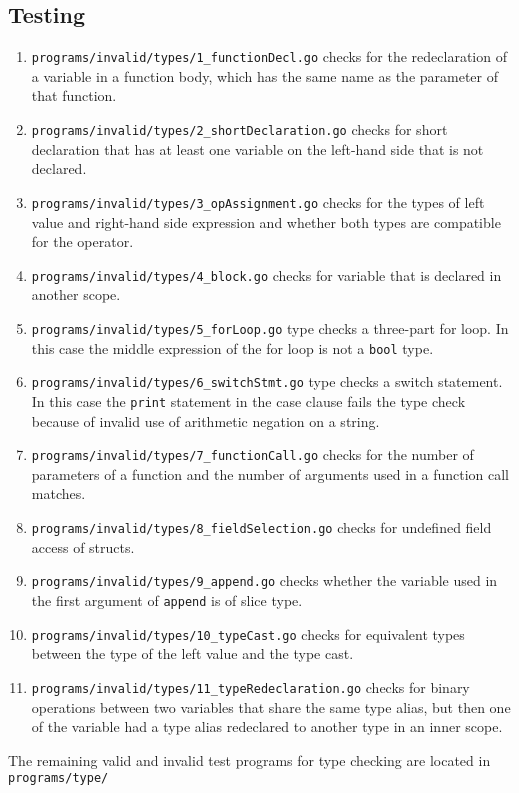 \documentclass{article}
\begin{document}
\subsection*{Testing}
\begin{enumerate}
	\item \verb|programs/invalid/types/1_functionDecl.go| checks for the redeclaration of a variable in a function body, which has the same name as the parameter of that function.
	\item \verb|programs/invalid/types/2_shortDeclaration.go| checks for short declaration that has at least one variable on the left-hand side that is not declared.
	\item \verb|programs/invalid/types/3_opAssignment.go| checks for the types of left value and right-hand side expression and whether both types are compatible for the operator.
	\item \verb|programs/invalid/types/4_block.go| checks for variable that is declared in another scope.
	\item \verb|programs/invalid/types/5_forLoop.go| type checks a three-part for loop. In this case the middle expression of the for loop is not a \verb|bool| type.
	\item \verb|programs/invalid/types/6_switchStmt.go| type checks a switch statement. In this case the \verb|print| statement in the case clause fails the type check because of invalid use of arithmetic negation on a string.
	\item \verb|programs/invalid/types/7_functionCall.go| checks for the number of parameters of a function and the number of arguments used in a function call matches.
	\item \verb|programs/invalid/types/8_fieldSelection.go| checks for undefined field access of structs.
	\item \verb|programs/invalid/types/9_append.go| checks whether the variable used in the first argument of \verb|append| is of slice type.
	\item \verb|programs/invalid/types/10_typeCast.go| checks for equivalent types between the type of the left value and the type cast.
	\item \verb|programs/invalid/types/11_typeRedeclaration.go| checks for binary operations between two variables that share the same type alias, but then one of the variable had a type alias redeclared to another type in an inner scope.
\end{enumerate}

The remaining valid and invalid test programs for type checking are located in \verb|programs/type/|
\hfill
\end{document}
